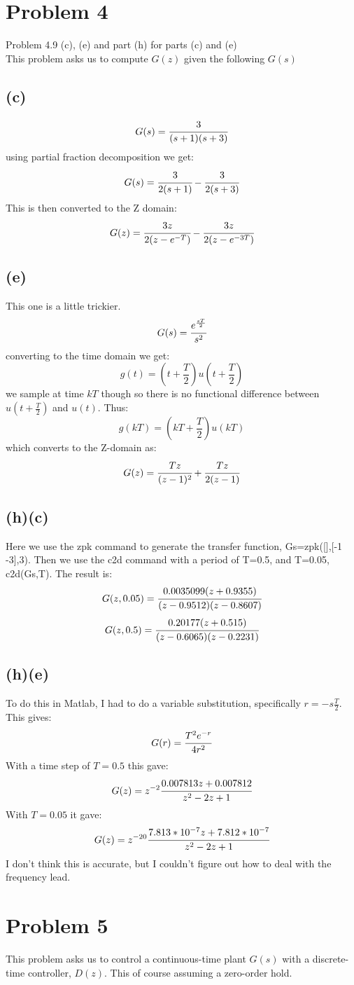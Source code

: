 \documentclass{article}
\begin{document}
\section*{Problem 4}
Problem 4.9 (c), (e) and part (h) for parts (c) and (e)\\
This problem asks us to compute $G(z)$ given the following $G(s)$
\subsection*{(c)}
\[G(s)=\cfrac{3}{(s+1)(s+3)}\]
using partial fraction decomposition we get:
\[G(s)=\cfrac{3}{2(s+1)}-\cfrac{3}{2(s+3)}\]
This is then converted to the Z domain:
\[G(z)=\cfrac{3z}{2(z-e^{-T})}-\cfrac{3z}{2(z-e^{-3T})}\]
\subsection*{(e)}
This one is a little trickier.
\[G(s)=\cfrac{e^{\frac{sT}{2}}}{s^2}\]
converting to the time domain we get:
\[g(t)=(t+\frac{T}{2})u(t+\frac{T}{2})\]
we sample at time $kT$ though so there is no functional difference between $u(t+\frac{T}{2})$ and $u(t)$. Thus:
\[g(kT)=(kT+\frac{T}{2})u(kT)\]
which converts to the Z-domain as:
\[G(z)=\cfrac{Tz}{(z-1)^2}+\cfrac{Tz}{2(z-1)}\]

\subsection*{(h)(c)}
Here we use the zpk command to generate the transfer function, Gs=zpk([],[-1 -3],3). Then we use the c2d command with a period of T=0.5, and T=0.05, c2d(Gs,T). The result is:
\[G(z,0.05)=\cfrac{0.0035099(z+0.9355)}{(z-0.9512)(z-0.8607)}\]
\[G(z,0.5)=\cfrac{0.20177(z+0.515)}{(z-0.6065)(z-0.2231)}\]

\subsection*{(h)(e)}
To do this in Matlab, I had to do a variable substitution, specifically $r=-s\frac{T}{2}$. This gives:
\[G(r)=\cfrac{T^2e^{-r}}{4r^2}\]
With a time step of $T=0.5$ this gave:
\[G(z)=z^{-2}\cfrac{0.007813z+0.007812}{z^2-2z+1}\]
With $T=0.05$ it gave:
\[G(z)=z^{-20}\cfrac{7.813*10^{-7}z+7.812*10^{-7}}{z^2-2z+1}\]
I don't think this is accurate, but I couldn't figure out how to deal with the frequency lead.

\section*{Problem 5}
This problem asks us to control a continuous-time plant $G(s)$ with a discrete-time controller, $D(z)$. This of course assuming a zero-order hold.
\end{document}
